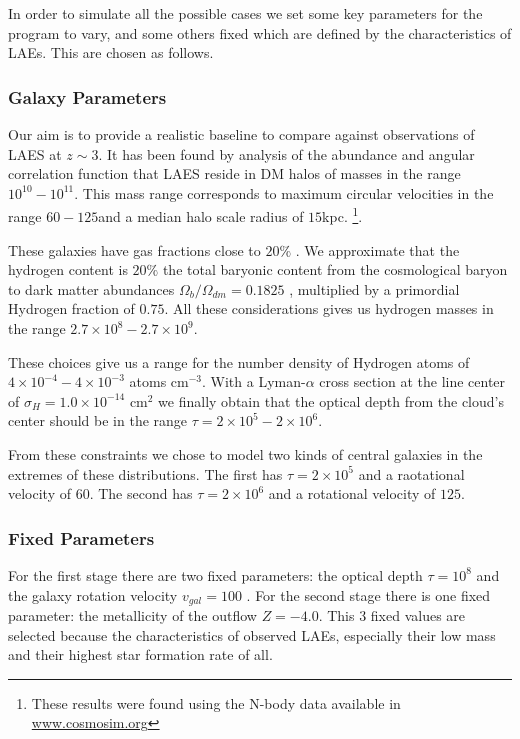 \documentclass{latex/emulateapj}
\begin{document}
In order to simulate all the possible cases we set some key parameters
for the program to vary, and some others fixed which are defined by
the characteristics of LAEs. This are chosen as follows.

\subsubsection{Galaxy Parameters}

Our aim is to provide a realistic baseline to compare against
observations of LAES at $z\sim 3$. 
It has been found by analysis of the abundance and angular correlation
function that LAES reside in DM halos of masses in the range
$10^{10}-10^{11}$\Msun \cite{WalkerSoler2012}. 
This mass range corresponds to maximum circular velocities in the
range $60-125$\kms and a median halo scale radius of
$15$kpc.  \footnote{These results were
  found using the  N-body data available in \url{www.cosmosim.org}}. 


These galaxies have gas fractions close to $20\%$
\citep{Narayanan2012}. We approximate that the hydrogen content is
$20\%$ the total baryonic content from the cosmological baryon to dark
matter  abundances $\Omega_b/\Omega_{dm}=0.1825$ \citep{Planck2015},
multiplied by a primordial Hydrogen fraction of $0.75$.
All these considerations gives us hydrogen masses in the range
$2.7\times 10^{8}-2.7\times 10^{9}$\Msun.


These choices give us a range for the number density of Hydrogen atoms
of $4\times10^{-4}-4\times 10^{-3}$ atoms cm$^{-3}$. 
With a Lyman-$\alpha$ cross section at the line center of
$\sigma_{H}=1.0\times 10^{-14}$ cm$^{2}$ we finally obtain that the
optical depth from the cloud's center  should be in the range $\tau=2
\times 10^{5} - 2 \times 10^{6}$.  


From these constraints we chose to model two kinds of central galaxies
in the extremes of these distributions. The first has $\tau =2\times
10^5$ and a raotational velocity of $60$\kms. The second has
$\tau=2\times 10^6$ and a rotational velocity of $125$\kms.


\subsubsection{Fixed Parameters}

For the first stage there are two fixed parameters: the optical depth
$\tau = 10^8$ and the galaxy rotation velocity $v_{gal}=100$ \kms. For
the second stage there is one fixed parameter: the metallicity of the
outflow $Z=-4.0$. This 3 fixed values are selected because the
characteristics of observed LAEs, especially their low mass and their
highest star formation rate of all. 
\end{document}
